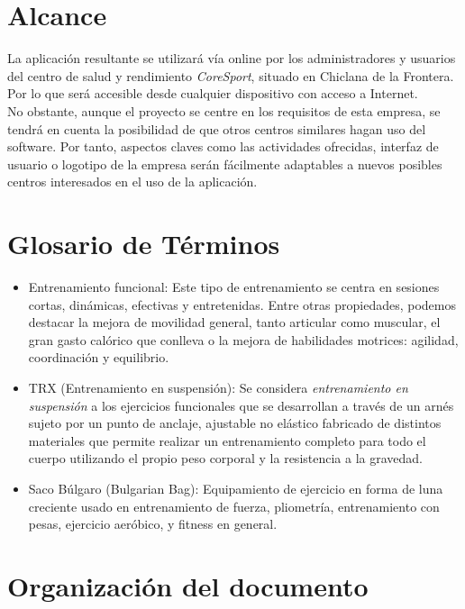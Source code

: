 \section{Alcance} 

La aplicación resultante se utilizará vía online por los administradores y usuarios del centro de salud y rendimiento \textsl{CoreSport}, situado en Chiclana de la Frontera. Por lo que será accesible desde cualquier dispositivo con acceso a Internet. 
\\

No obstante, aunque el proyecto se centre en los requisitos de esta empresa, se tendrá en cuenta la posibilidad de que otros centros similares hagan uso del software. Por tanto, aspectos claves como las actividades ofrecidas, interfaz de usuario o logotipo de la empresa serán fácilmente adaptables a nuevos posibles centros interesados en el uso de la aplicación. 


\section{Glosario de Términos} 

\begin{itemize} 
\item Entrenamiento funcional: Este tipo de entrenamiento se centra en sesiones cortas, dinámicas, efectivas y entretenidas. Entre otras propiedades, podemos destacar la mejora de movilidad general, tanto articular como muscular, el gran gasto calórico que conlleva o la mejora de habilidades motrices: agilidad, coordinación y equilibrio. 
\item TRX (Entrenamiento en suspensión):  Se considera \textsl{entrenamiento en suspensión} a los ejercicios funcionales que se desarrollan a través de un arnés sujeto por un punto de anclaje, ajustable no elástico fabricado de distintos materiales que permite realizar un entrenamiento completo para todo el cuerpo utilizando el propio peso corporal y la resistencia a la gravedad.
\item Saco Búlgaro (Bulgarian Bag): Equipamiento de ejercicio en forma de luna creciente usado en entrenamiento de fuerza, pliometría, entrenamiento con pesas, ejercicio aeróbico, y fitness en general.
\end {itemize}


\section{Organización del documento}

